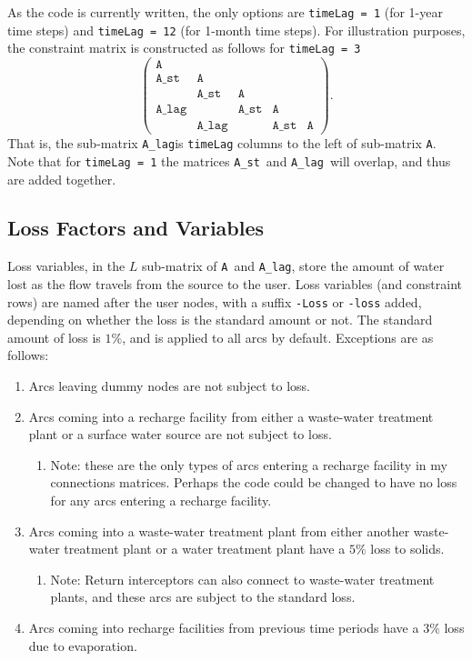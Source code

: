 \documentclass[11pt]{article}
\newcommand{\A}{\texttt{A}}
\newcommand{\Ast}{\texttt{A\_st}}
\newcommand{\Alag}{\texttt{A\_lag}}
\begin{document}
As the code is currently written, the only options are \texttt{timeLag = 1} (for 1-year time steps) and \texttt{timeLag = 12} (for 1-month time steps).
For illustration purposes, the constraint matrix is constructed as follows for \texttt{timeLag = 3}
\[
	\left(
	\begin{array}{ccccc}
		\A    &       &      &      &    \\
		\Ast  & \A    &      &      &    \\
		      & \Ast  & \A   &      &    \\
		\Alag &       & \Ast & \A   &    \\
		      & \Alag &      & \Ast & \A
	\end{array}
	\right).
\]
That is, the sub-matrix \Alag is \texttt{timeLag} columns to the left of sub-matrix \A.
Note that for \texttt{timeLag = 1} the matrices \Ast\ and \Alag\ will overlap, and thus are added together.

\subsection{Loss Factors and Variables}
\label{ssec:loss}

Loss variables, in the $L$ sub-matrix of \A\ and \Alag, store the amount of water lost as the flow travels from the source to the user.
Loss variables (and constraint rows) are named after the user nodes, with a suffix \texttt{-Loss} or \texttt{-loss} added, depending on whether the loss is the standard amount or not.
The standard amount of loss is $1\%$, and is applied to all arcs by default.
Exceptions are as follows:
\begin{enumerate}
	\item Arcs leaving dummy nodes are not subject to loss.
	\item Arcs coming into a recharge facility from either a waste-water treatment plant or a surface water source are not subject to loss.
	\begin{enumerate}
		\item Note: these are the only types of arcs entering a recharge facility in my connections matrices.
				Perhaps the code could be changed to have no loss for any arcs entering a recharge facility.
	\end{enumerate}
	\item Arcs coming into a waste-water treatment plant from either another waste-water treatment plant or a water treatment plant have a $5\%$ loss to solids.
	\begin{enumerate}
		\item Note: Return interceptors can also connect to waste-water treatment plants, and these arcs are subject to the standard loss.
	\end{enumerate}
	\item Arcs coming into recharge facilities from previous time periods have a $3\%$ loss due to evaporation.
\end{enumerate}
\end{document}
